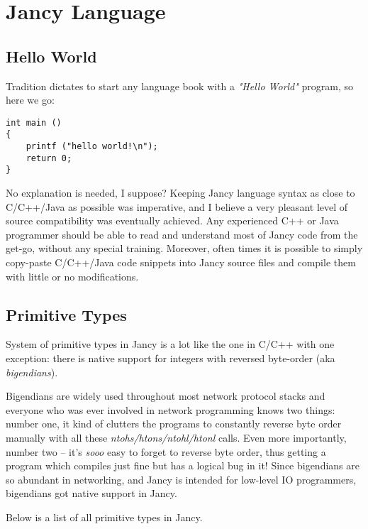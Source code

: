 \documentclass[oneside]{book}
\begin{document}
\chapter{Jancy Language}

\section{Hello World}

Tradition dictates to start any language book with a \emph{"Hello World"} program, so here we go:

\begin{lstlisting}
int main ()
{
    printf ("hello world!\n");
    return 0;
}
\end{lstlisting}

No explanation is needed, I suppose? Keeping Jancy language syntax as close to C/C++/Java as possible was imperative, and I believe a very pleasant level of source compatibility was eventually achieved. Any experienced C++ or Java programmer should be able to read and understand most of Jancy code from the get-go, without any special training. Moreover, often times it is possible to simply copy-paste C/C++/Java code snippets into Jancy source files and compile them with little or no modifications.

\section{Primitive Types}

System of primitive types in Jancy is a lot like the one in C/C++ with one exception: there is native support for integers with reversed byte-order (aka \emph{bigendians}). 

Bigendians are widely used throughout most network protocol stacks and everyone who was ever involved in network programming knows two things: number one, it kind of clutters the programs to constantly reverse byte order manually with all these \emph{ntohs/htons/ntohl/htonl} calls. Even more importantly, number two -- it's \emph{sooo} easy to forget to reverse byte order, thus getting a program which compiles just fine but has a logical bug in it! Since bigendians are so abundant in networking, and Jancy is intended for low-level IO programmers, bigendians got native support in Jancy. 

Below is a list of all primitive types in Jancy.
\end{document}
